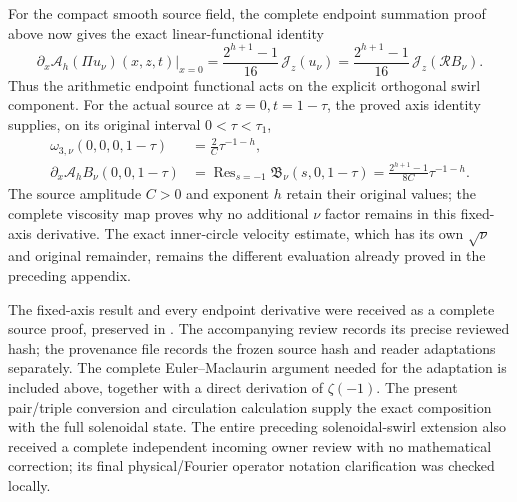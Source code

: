For the compact smooth source field, the complete endpoint summation
proof above now gives the exact linear-functional identity
\[
 \left.\partial_x\mathcal A_h(\Pi u_\nu)(x,z,t)\right|_{x=0}
    =\frac{2^{h+1}-1}{16}\,\mathcal J_z(u_\nu)
    =\frac{2^{h+1}-1}{16}\,\mathcal J_z(\mathcal R B_\nu).
\]
Thus the arithmetic endpoint functional acts on the explicit orthogonal
swirl component. For the actual source at \(z=0,t=1-\tau\), the proved
axis identity supplies, on its original interval \(0<\tau<\tau_1\),
\begin{align*}
 \omega_{3,\nu}(0,0,0,1-\tau)&=\frac2C\tau^{-1-h},\\
 \partial_x\mathcal A_hB_\nu(0,0,1-\tau)
 &=\operatorname{Res}_{s=-1}\mathfrak B_\nu(s,0,1-\tau)
  =\frac{2^{h+1}-1}{8C}\tau^{-1-h}.
\end{align*}
The source amplitude \(C>0\) and exponent \(h\) retain their original
values; the complete viscosity map proves why no additional \(\nu\)
factor remains in this fixed-axis derivative. The exact inner-circle
velocity estimate, which has its own \(\sqrt\nu\) and original remainder,
remains the different evaluation already proved in the preceding appendix.

The fixed-axis result and every endpoint derivative were received as a
complete source proof, preserved in .
The accompanying review records its precise reviewed hash; the provenance
file records the frozen source hash and reader adaptations separately.
The complete Euler--Maclaurin argument needed for the adaptation is
included above, together with a direct derivation of \(\zeta(-1)\).
The present pair/triple conversion and circulation calculation supply the
exact composition with the full solenoidal state. The entire preceding
solenoidal-swirl extension also received a complete independent incoming
owner review with no mathematical correction; its final physical/Fourier
operator notation clarification was checked locally.
